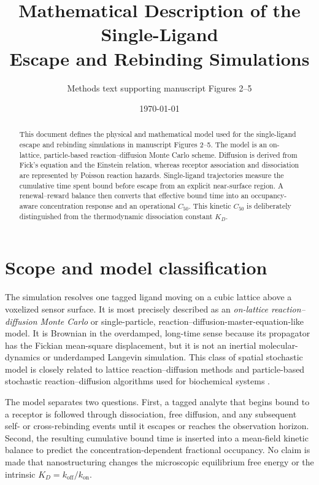 \documentclass[11pt]{article}
\title{Mathematical Description of the Single-Ligand\\
Escape and Rebinding Simulations}
\author{Methods text supporting manuscript Figures 2--5}
\date{\today}
\newcommand{\kOn}{k_{\mathrm{on}}}
\newcommand{\kOff}{k_{\mathrm{off}}}
\begin{document}
\maketitle

\begin{abstract}
This document defines the physical and mathematical model used for the
single-ligand escape and rebinding simulations in manuscript Figures 2--5.
The model is an on-lattice, particle-based reaction--diffusion Monte Carlo
scheme.  Diffusion is derived from Fick's equation and the Einstein relation,
whereas receptor association and dissociation are represented by Poisson
reaction hazards.  Single-ligand trajectories measure the cumulative time
spent bound before escape from an explicit near-surface region.  A
renewal--reward balance then converts that effective bound time into an
occupancy-aware concentration response and an operational $C_{50}$.  This
kinetic $C_{50}$ is deliberately distinguished from the thermodynamic
dissociation constant $K_D$.
\end{abstract}

\section{Scope and model classification}

The simulation resolves one tagged ligand moving on a cubic lattice above a
voxelized sensor surface.  It is most precisely described as an
\emph{on-lattice reaction--diffusion Monte Carlo} or single-particle,
reaction--diffusion-master-equation-like model.  It is Brownian in the
overdamped, long-time sense because its propagator has the Fickian mean-square
displacement, but it is not an inertial molecular-dynamics or underdamped
Langevin simulation.  This class of spatial stochastic model is closely
related to lattice reaction--diffusion methods and particle-based stochastic
reaction--diffusion algorithms used for biochemical systems
\citep{gillespie1976,andrews2004,isaacson2008,hellander2012}.

The model separates two questions.  First, a tagged analyte that begins bound
to a receptor is followed through dissociation, free diffusion, and any
subsequent self- or cross-rebinding events until it escapes or reaches the
observation horizon.  Second, the resulting cumulative bound time is inserted
into a mean-field kinetic balance to predict the concentration-dependent
fractional occupancy.  No claim is made that nanostructuring changes the
microscopic equilibrium free energy or the intrinsic $K_D=\kOff/\kOn$.
\end{document}
